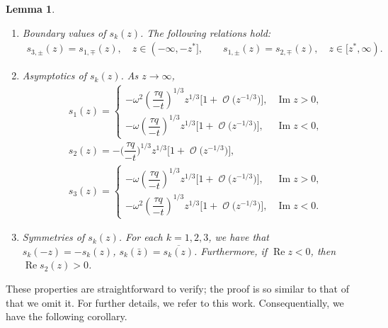 \documentclass[10pt,a4paper]{amsart}
\DeclareMathOperator{\OO}{\mathcal{O}}
\numberwithin{equation}{section}
\newtheorem{Lemma}[Theorem]{Lemma}
\begin{document}
 \begin{Lemma}\quad
 \begin{enumerate}\itemsep=0pt
 \item[$(1)$] \textit{Boundary values of $s_k(z)$.}
 The following relations hold:
 \begin{gather*}
 s_{3,\pm}(z) = s_{1,\mp}(z),\quad z \in (-\infty,-z^{*}],\qquad s_{1,\pm}(z) = s_{2,\mp}(z),\quad z \in [z^{*},\infty).
 \end{gather*}
 \item[$(2)$] \textit{Asymptotics of $s_k(z)$.} As $z\to \infty$,
 \begin{align*}
 &s_1(z)=
 \begin{cases}
 -\omega^2 \left(\dfrac{\tau q}{-t}\right)^{1/3} z^{1/3}\bigl[1 + \OO\bigl(z^{-1/3}\bigr)\bigr], & \operatorname{Im} z >0,\\
 -\omega \left(\dfrac{\tau q}{-t}\right)^{1/3} z^{1/3}\bigl[1 + \OO\bigl(z^{-1/3}\bigr)\bigr], & \operatorname{Im} z <0,
 \end{cases}\\
 &s_2(z)= -(\dfrac{\tau q}{-t}\biggr)^{1/3} z^{1/3}\bigl[1+ \OO\bigl(z^{-1/3}\bigr)\bigr],\\
 &s_3(z)=
 \begin{cases}
 -\omega \left(\dfrac{\tau q}{-t}\right)^{1/3} z^{1/3}\bigl[1 + \OO\bigl(z^{-1/3}\bigr)\bigr], & \operatorname{Im} z >0,\\
 -\omega^2 \left(\dfrac{\tau q}{-t}\right)^{1/3} z^{1/3}\bigl[1 + \OO\bigl(z^{-1/3}\bigr)\bigr], & \operatorname{Im} z <0.
 \end{cases}
 \end{align*}
 \item[$(3)$] \textit{Symmetries of $s_k(z)$.} For each $k=1,2,3$, we have that
$s_k(-z) = -s_k(z)$, $s_k(\bar{z}) = \overline{s_k(z)}$.
 Furthermore, if $\operatorname{Re} z < 0$, then $\operatorname{Re} s_2(z)>0$.
 \end{enumerate}
 \end{Lemma}
These properties are straightforward to verify; the proof is so similar to that of~\cite[Lemmas~2.1 and~2.3]{DKM} that we omit it. For further details, we refer to this work. Consequentially, we have the following corollary.
\end{document}
